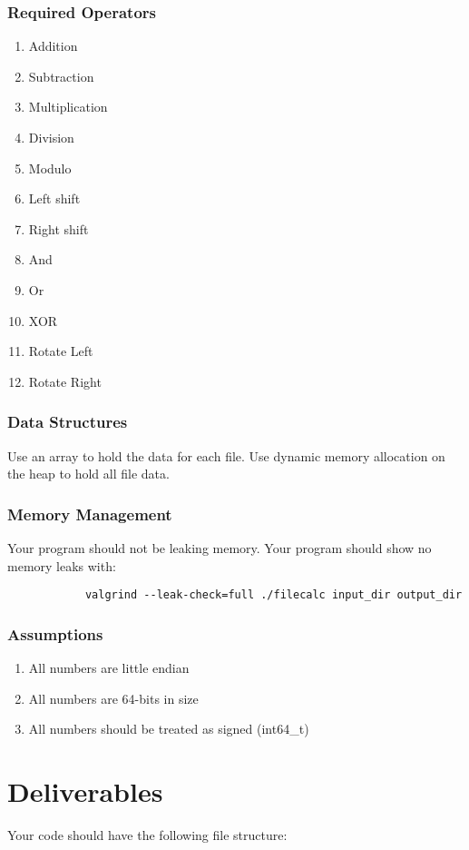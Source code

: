 \documentclass[letterpaper,12pt]{article}
\begin{document}
	\subsubsection{Required Operators}
		\begin{enumerate}
			\item Addition 
			\item Subtraction
			\item Multiplication
			\item Division
			\item Modulo 
			\item Left shift 
			\item Right shift 
			\item And
			\item Or
			\item XOR
			\item Rotate Left
			\item Rotate Right
		\end{enumerate}
	
	\subsubsection{Data Structures}
	Use an array to hold the data for each file. Use dynamic memory allocation on the heap to hold all file data.
	
	\subsubsection{Memory Management}
	Your program should not be leaking memory. Your program should show no memory leaks with:
		\begin{lstlisting}
			valgrind --leak-check=full ./filecalc input_dir output_dir 
		\end{lstlisting}
	
	\subsubsection{Assumptions}
		\begin{enumerate}
			\item All numbers are little endian
			\item All numbers are 64-bits in size
			\item All numbers should be treated as signed (int64\_t)
		\end{enumerate}
	
	\section{Deliverables}
	Your code should have the following file structure:
	\hfill
\end{document}
